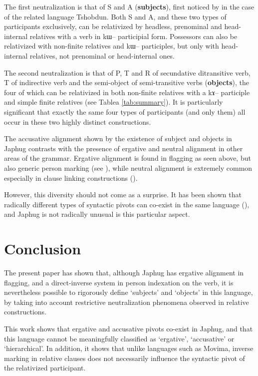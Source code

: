 \documentclass[oldfontcommands,oneside,a4paper,11pt]{article}
\newcommand{\ipa}[1]{{\phon #1}} %
\begin{document}
The first neutralization is that of S and A (\textbf{subjects}), first noticed by \citet{jackson03caodeng}  in the case of the related language Tshobdun. Both S and A, and these two types of participants exclusively, can be relativized by headless, prenominal and head-internal relatives with a verb in \ipa{kɯ--} participial form. Possessors can also be relativized with non-finite relatives and \ipa{kɯ--} participles, but only with head-internal relatives, not prenominal or head-internal ones. 

The second neutralization is that of P, T and R of secundative ditransitive verb, T of indirective verb and the semi-object of semi-transitive verbs (\textbf{objects}), the four of which can be relativized in both non-finite relatives with a \ipa{kɤ--} participle and simple finite relatives (see Tablea \ref{tab:summary}). It is particularly significant that exactly the same four types of participants (and only them) all occur in these two highly distinct constructions.

The accusative alignment shown by the existence of subject and objects in Japhug contrasts with the presence of ergative and neutral alignment  in other areas of the grammar. Ergative alignment is found in flagging as seen above, but also generic person marking (see \citealt{jacques12demotion}), while neutral alignment is extremely common especially in clause linking constructions (\citealt{jacques14linking}).

However, this diversity should not come as a surprise. It has been shown that radically  different types of syntactic pivots can co-exist in the same language (\citealt[282]{vanvalin97syntax}), and Japhug is not radically unusual is this particular aspect. 


\section{Conclusion}

The present paper has shown that, although Japhug has ergative alignment in flagging, and a direct-inverse system in person indexation on the verb, it is nevertheless possible to rigorously define `subjects' and `objects' in this language, by taking into account restrictive neutralization phenomena observed in relative constructions.

This work shows that ergative and accusative pivots co-exist in Japhug, and that this language cannot be meaningfully classified as `ergative', `accusative' or `hierarchical'. In addition, it shows that unlike languages such as Movima, inverse marking in relative clauses does not necessarily influence the syntactic pivot of the relativized participant.



\end{document}
